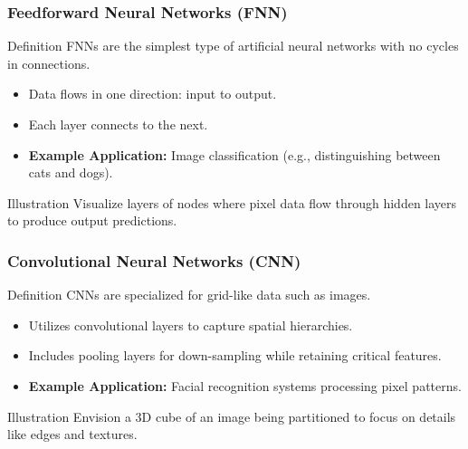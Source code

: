\documentclass[aspectratio=169]{beamer}
\begin{document}
\begin{frame}[fragile]
    \frametitle{Feedforward Neural Networks (FNN)}
    \begin{block}{Definition}
        FNNs are the simplest type of artificial neural networks with no cycles in connections.
    \end{block}
    
    \begin{itemize}
        \item Data flows in one direction: input to output.
        \item Each layer connects to the next.
        \item \textbf{Example Application:} Image classification (e.g., distinguishing between cats and dogs).
    \end{itemize}

    \begin{block}{Illustration}
        Visualize layers of nodes where pixel data flow through hidden layers to produce output predictions.
    \end{block}
\end{frame}

\begin{frame}[fragile]
    \frametitle{Convolutional Neural Networks (CNN)}
    \begin{block}{Definition}
        CNNs are specialized for grid-like data such as images.
    \end{block}

    \begin{itemize}
        \item Utilizes convolutional layers to capture spatial hierarchies.
        \item Includes pooling layers for down-sampling while retaining critical features.
        \item \textbf{Example Application:} Facial recognition systems processing pixel patterns.
    \end{itemize}

    \begin{block}{Illustration}
        Envision a 3D cube of an image being partitioned to focus on details like edges and textures.
    \end{block}
\end{frame}
\end{document}
